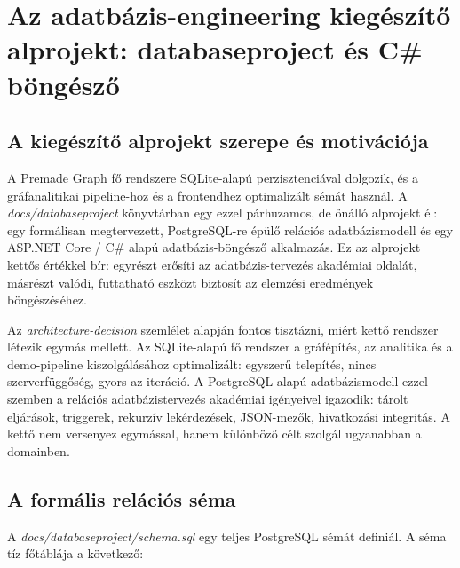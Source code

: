 \chapter{Az adatbázis-engineering kiegészítő alprojekt: databaseproject és C\# böngésző}

\section{A kiegészítő alprojekt szerepe és motivációja}

A Premade Graph fő rendszere SQLite-alapú perzisztenciával dolgozik, és a gráfanalitikai pipeline-hoz és a frontendhez optimalizált sémát használ. A \textit{docs/databaseproject} könyvtárban egy ezzel párhuzamos, de önálló alprojekt él: egy formálisan megtervezett, PostgreSQL-re épülő relációs adatbázismodell és egy ASP.NET Core / C\# alapú adatbázis-böngésző alkalmazás. Ez az alprojekt kettős értékkel bír: egyrészt erősíti az adatbázis-tervezés akadémiai oldalát, másrészt valódi, futtatható eszközt biztosít az elemzési eredmények böngészéséhez.

Az \textit{architecture-decision} szemlélet alapján fontos tisztázni, miért kettő rendszer létezik egymás mellett. Az SQLite-alapú fő rendszer a gráfépítés, az analitika és a demo-pipeline kiszolgálásához optimalizált: egyszerű telepítés, nincs szerverfüggőség, gyors az iteráció. A PostgreSQL-alapú adatbázismodell ezzel szemben a relációs adatbázistervezés akadémiai igényeivel igazodik: tárolt eljárások, triggerek, rekurzív lekérdezések, JSON-mezők, hivatkozási integritás. A kettő nem versenyez egymással, hanem különböző célt szolgál ugyanabban a domainben.

\section{A formális relációs séma}

A \textit{docs/databaseproject/schema.sql} egy teljes PostgreSQL sémát definiál. A séma tíz főtáblája a következő:

